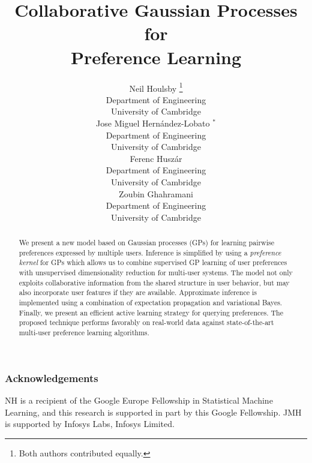 \documentclass{article}
\author{
Neil Houlsby \thanks{Both authors contributed equally.} \\
Department of Engineering\\
University of Cambridge \\
\And
Jose Miguel Hern\'{a}ndez-Lobato $^*$  \\
Department of Engineering\\
University of Cambridge \\
\AND
Ferenc Husz\'{a}r \\
Department of Engineering\\
University of Cambridge \\
\And
Zoubin Ghahramani \\
Department of Engineering\\
University of Cambridge \\
}
\begin{document}
\title{Collaborative Gaussian Processes for\\ Preference Learning}

\newcommand{\argmax}{ \operatorname*{arg \max}}
\newcommand{\argmin}{ \operatorname*{arg \min}} 
\newcommand{\x}{\mathbf{x}} 
\newcommand{\pair}{(\x,\x')} 
\newcommand{\param}{\bm{\theta}}
\newcommand{\X}{\mathbf{X}} 
\newcommand{\y}{y}
\newcommand{\data}{\mathcal{D}} 
\newcommand{\h}{\mathbf{H}} 
\newcommand{\g}{\mathbf{G}} 
\newcommand{\w}{\mathbf{W}} 
\newcommand{\pr}{\mathrm{P}} 
\newcommand{\ent}{\mathrm{H}} 
\newcommand{\info}{\mathrm{I}}
\newcommand{\E}{\mathbb{E}}
\newcommand{\T}{\mathrm{T}}
\newcommand{\ie}{i.\,e.\ }
\newcommand{\eg}{e.\,g.\ }
\newcommand{\latfun}{f}
\newcommand{\List}{\mathcal{L}}

\nipsfinalcopy

\maketitle

\begin{abstract}
We present a new model based on Gaussian processes (GPs) for learning pairwise preferences expressed by multiple users.
Inference is simplified by using a \emph{preference kernel} for GPs
which allows us to combine supervised GP learning of user preferences with unsupervised dimensionality
reduction for multi-user systems. The model not only exploits collaborative information from
the shared structure in user behavior, but may also incorporate user
features if they are available. 
Approximate inference is implemented using a combination of
expectation propagation and variational Bayes. 
Finally, we present an efficient active learning strategy for querying preferences.
The proposed technique performs favorably on real-world data against state-of-the-art multi-user preference
learning algorithms.
\end{abstract}






%


\subsubsection*{Acknowledgements}
NH is a recipient of the Google Europe Fellowship in Statistical Machine Learning, and this research is supported in part by this Google Fellowship.
JMH is supported by Infosys Labs, Infosys Limited.

\newpage


\end{document}
